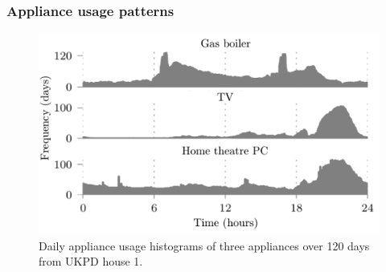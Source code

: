 \documentclass{sig-alternate}
\begin{document}
%
%
%

\subsubsection{Appliance usage patterns}
\label{sec:usage_hist}
\begin{figure}[!t]
  \centering
  \includegraphics[width=\columnwidth]{figures/daily_usage_histograms3.pdf}
  \caption{Daily appliance usage histograms of three appliances over 120 days from UKPD house 1.}
  \label{fig:daily_usage_histograms}
\end{figure} 
\end{document}
